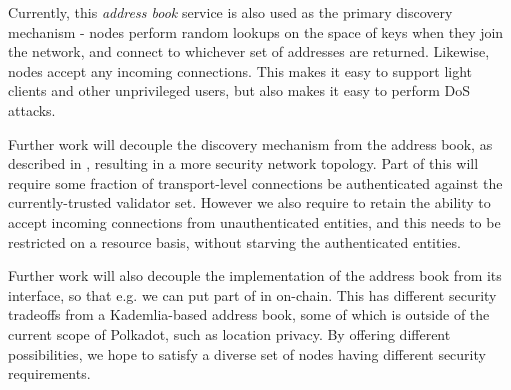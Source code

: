 Currently, this \emph{address book} service is also used as the primary discovery mechanism - nodes perform random lookups on the space of keys when they join the network, and connect to whichever set of addresses are returned. Likewise, nodes accept any incoming connections. This makes it easy to support light clients and other unprivileged users, but also makes it easy to perform DoS attacks.

Further work will decouple the discovery mechanism from the address book, as described in , resulting in a more security network topology. Part of this will require some fraction of transport-level connections be authenticated against the currently-trusted validator set. However we also require to retain the ability to accept incoming connections from unauthenticated entities, and this needs to be restricted on a resource basis, without starving the authenticated entities.

Further work will also decouple the implementation of the address book from its interface, so that e.g. we can put part of in on-chain. This has different security tradeoffs from a Kademlia-based address book, some of which is outside of the current scope of Polkadot, such as location privacy. By offering different possibilities, we hope to satisfy a diverse set of nodes having different security requirements.
